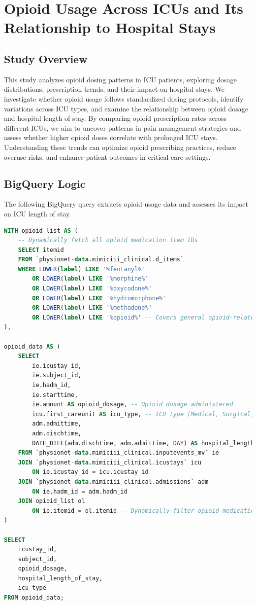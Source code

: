 \documentclass[a4paper,10pt]{article}
\begin{document}


\section{Opioid Usage Across ICUs and Its Relationship to Hospital Stays}

\subsection{Study Overview}
This study analyzes opioid dosing patterns in ICU patients, exploring dosage distributions, prescription trends, and their impact on hospital stays. We investigate whether opioid usage follows standardized dosing protocols, identify variations across ICU types, and examine the relationship between opioid dosage and hospital length of stay. By comparing opioid prescription rates across different ICUs, we aim to uncover patterns in pain management strategies and assess whether higher opioid doses correlate with prolonged ICU stays. Understanding these trends can optimize opioid prescribing practices, reduce overuse risks, and enhance patient outcomes in critical care settings.

\subsection{BigQuery Logic}
The following BigQuery query extracts opioid usage data and assesses its impact on ICU length of stay.

\begin{lstlisting}[language=SQL]
WITH opioid_list AS (
    -- Dynamically fetch all opioid medication item IDs
    SELECT itemid 
    FROM `physionet-data.mimiciii_clinical.d_items`
    WHERE LOWER(label) LIKE '%fentanyl%'
        OR LOWER(label) LIKE '%morphine%'
        OR LOWER(label) LIKE '%oxycodone%'
        OR LOWER(label) LIKE '%hydromorphone%'
        OR LOWER(label) LIKE '%methadone%'
        OR LOWER(label) LIKE '%opioid%' -- Covers general opioid-related terms
),

opioid_data AS (
    SELECT 
        ie.icustay_id,
        ie.subject_id,
        ie.hadm_id,
        ie.starttime,
        ie.amount AS opioid_dosage, -- Opioid dosage administered
        icu.first_careunit AS icu_type, -- ICU type (Medical, Surgical, etc.)
        adm.admittime,
        adm.dischtime,
        DATE_DIFF(adm.dischtime, adm.admittime, DAY) AS hospital_length_of_stay
    FROM `physionet-data.mimiciii_clinical.inputevents_mv` ie
    JOIN `physionet-data.mimiciii_clinical.icustays` icu 
        ON ie.icustay_id = icu.icustay_id
    JOIN `physionet-data.mimiciii_clinical.admissions` adm 
        ON ie.hadm_id = adm.hadm_id
    JOIN opioid_list ol 
        ON ie.itemid = ol.itemid -- Dynamically filter opioid medications
)

SELECT 
    icustay_id,
    subject_id,
    opioid_dosage,
    hospital_length_of_stay,
    icu_type
FROM opioid_data;
\end{lstlisting}
\end{document}

